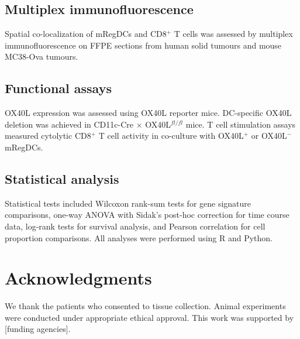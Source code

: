 \documentclass[11pt]{article}
\begin{document}
\subsection{Multiplex immunofluorescence}

Spatial co-localization of mRegDCs and CD8$^{+}$ T cells was assessed by multiplex immunofluorescence on FFPE sections from human solid tumours and mouse MC38-Ova tumours.

\subsection{Functional assays}

OX40L expression was assessed using OX40L reporter mice. DC-specific OX40L deletion was achieved in CD11c-Cre $\times$ OX40L$^{fl/fl}$ mice. T cell stimulation assays measured cytolytic CD8$^{+}$ T cell activity in co-culture with OX40L$^{+}$ or OX40L$^{-}$ mRegDCs.

\subsection{Statistical analysis}

Statistical tests included Wilcoxon rank-sum tests for gene signature comparisons, one-way ANOVA with Sidak's post-hoc correction for time course data, log-rank tests for survival analysis, and Pearson correlation for cell proportion comparisons. All analyses were performed using R and Python.

\section{Acknowledgments}

We thank the patients who consented to tissue collection. Animal experiments were conducted under appropriate ethical approval. This work was supported by [funding agencies].



\end{document}
